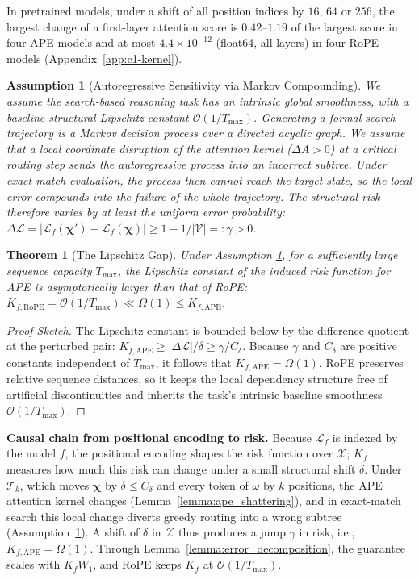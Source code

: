 \documentclass{article}
\newtheorem{assumption}{Assumption}
\newtheorem{theorem}{Theorem}
\begin{document}
In pretrained models, under a shift of all position indices by $16$, $64$ or $256$, the largest change of a first-layer attention score is $0.42$--$1.19$ of the largest score in four APE models and at most $4.4\times10^{-12}$ (float64, all layers) in four RoPE models (Appendix~\ref{app:c1-kernel}).

\begin{assumption}[Autoregressive Sensitivity via Markov Compounding]
\label{assum:ar_sensitivity}
We assume the search-based reasoning task has an intrinsic global smoothness, with a baseline structural Lipschitz constant $\mathcal{O}(1/T_{\max})$. Generating a formal search trajectory is a Markov decision process over a directed acyclic graph. We assume that a local coordinate disruption of the attention kernel ($\Delta A > 0$) at a critical routing step sends the autoregressive process into an incorrect subtree. Under exact-match evaluation, the process then cannot reach the target state, so the local error compounds into the failure of the whole trajectory. The structural risk therefore varies by at least the uniform error probability: $\Delta \mathcal{L} = |\mathcal{L}_f(\boldsymbol{\chi}') - \mathcal{L}_f(\boldsymbol{\chi})| \ge 1 - 1/|\mathcal{V}| =: \gamma > 0$.
\end{assumption}

\begin{theorem}[The Lipschitz Gap]
\label{thm:lipschitz_gap}
Under Assumption \ref{assum:ar_sensitivity}, for a sufficiently large sequence capacity $T_{\max}$, the Lipschitz constant of the induced risk function for APE is asymptotically larger than that of RoPE: $K_{f, \mathrm{RoPE}} = \mathcal{O}(1/T_{\max}) \ll \Omega(1) \le K_{f, \mathrm{APE}}$.
\end{theorem}

\begin{proof}[Proof Sketch] 
The Lipschitz constant is bounded below by the difference quotient at the perturbed pair: $K_{f, \mathrm{APE}} \ge |\Delta \mathcal{L}| / \delta \ge \gamma / C_\delta$. Because $\gamma$ and $C_\delta$ are positive constants independent of $T_{\max}$, it follows that $K_{f, \mathrm{APE}} = \Omega(1)$. RoPE preserves relative sequence distances, so it keeps the local dependency structure free of artificial discontinuities and inherits the task's intrinsic baseline smoothness $\mathcal{O}(1/T_{\max})$.
\end{proof}

\textbf{Causal chain from positional encoding to risk.} %
Because $\mathcal{L}_f$ is indexed by the model $f$, the positional encoding shapes the risk function over $\mathcal{X}$; $K_f$ measures how much this risk can change under a small structural shift $\delta$. Under $\mathcal{T}_k$, which moves $\boldsymbol{\chi}$ by $\delta \le C_\delta$ and every token of $\omega$ by $k$ positions, the APE attention kernel changes (Lemma~\ref{lemma:ape_shattering}), and in exact-match search this local change diverts greedy routing into a wrong subtree (Assumption~\ref{assum:ar_sensitivity}). A shift of $\delta$ in $\mathcal{X}$ thus produces a jump $\gamma$ in risk, i.e., $K_{f,\mathrm{APE}}=\Omega(1)$. Through Lemma~\ref{lemma:error_decomposition}, the guarantee scales with $K_f W_1$, and RoPE keeps $K_f$ at $\mathcal{O}(1/T_{\max})$.
\end{document}

